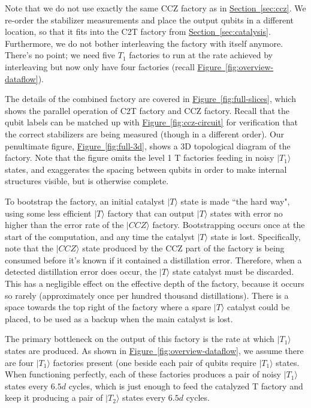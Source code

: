 \documentclass[superscriptaddress,notitlepage,longbibliography]{revtex4-1}
\renewcommand{\sec}[1]{\hyperref[sec:#1]{Section~\ref*{sec:#1}}}
\newcommand{\fig}[1]{\hyperref[fig:#1]{Figure~\ref*{fig:#1}}}
\begin{document}
Note that we do not use exactly the same CCZ factory as in \sec{ccz}.
We re-order the stabilizer measurements and place the output qubits in a different location, so that it fits into the C2T factory from \sec{catalysis}.
Furthermore, we do not bother interleaving the factory with itself anymore.
There's no point; we need five $T_1$ factories to run at the rate achieved by interleaving but now only have four factories (recall \fig{overview-dataflow}).

The details of the combined factory are covered in \fig{full-slices}, which shows the parallel operation of C2T factory and CCZ factory.
Recall that the qubit labels can be matched up with \fig{ccz-circuit} for verification that the correct stabilizers are being measured (though in a different order).
Our penultimate figure, \fig{full-3d}, shows a 3D topological diagram of the factory.
Note that the figure omits the level 1 T factories feeding in noisy $|T_1\rangle$ states, and exaggerates the spacing between qubits in order to make internal structures visible, but is otherwise complete.

To bootstrap the factory, an initial catalyst $|T\rangle$ state is made ``the hard way", using some less efficient $|T\rangle$ factory that can output $|T\rangle$ states with error no higher than the error rate of the $|CCZ\rangle$ factory.
Bootstrapping occurs once at the start of the computation, and any time the catalyst $|T\rangle$ state is lost.
Specifically, note that the $|CCZ\rangle$ state produced by the CCZ part of the factory is being consumed before it's known if it contained a distillation error.
Therefore, when a detected distillation error does occur, the $|T\rangle$ state catalyst must be discarded.
This has a negligible effect on the effective depth of the factory, because it occurs so rarely (approximately once per hundred thousand distillations).
There is a space towards the top right of the factory where a spare $|T\rangle$ catalyst could be placed, to be used as a backup when the main catalyst is lost.

The primary bottleneck on the output of this factory is the rate at which $|T_1\rangle$ states are produced.
As shown in \fig{overview-dataflow}, we assume there are four $|T_1\rangle$ factories present (one beside each pair of qubits require $|T_1\rangle$ states.
When functioning perfectly, each of these factories produces a pair of noisy $|T_1\rangle$ states every $6.5d$ cycles, which is just enough to feed the catalyzed T factory and keep it producing a pair of $|T_2\rangle$ states every $6.5d$ cycles.
\end{document}
